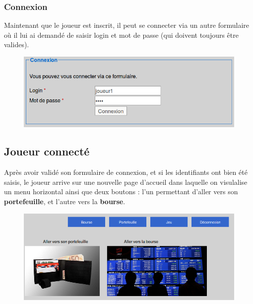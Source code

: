     \subsubsection{Connexion}
    Maintenant que le joueur est inscrit, il peut se connecter via un autre formulaire où il lui ai demandé de saisir login et mot de passe (qui doivent toujours être valides). 
    \begin{figure}[H]
      \center
      \includegraphics[scale=0.5]{../graph/3-connexion.png}
    \end{figure}

  \subsection{Joueur connecté}  
  Après avoir validé son formulaire de connexion, et si les identifiants ont bien été saisis, le joueur arrive sur une nouvelle page d'accueil dans laquelle on visulalise un menu horizontal ainsi que deux boutons : l'un permettant d'aller vers son \textbf{portefeuille}, et l'autre vers la \textbf{bourse}.
  \begin{figure}[H]
    \center
    \includegraphics[scale=0.5]{../graph/4-accueilconnecte.png}
  \end{figure}
    
